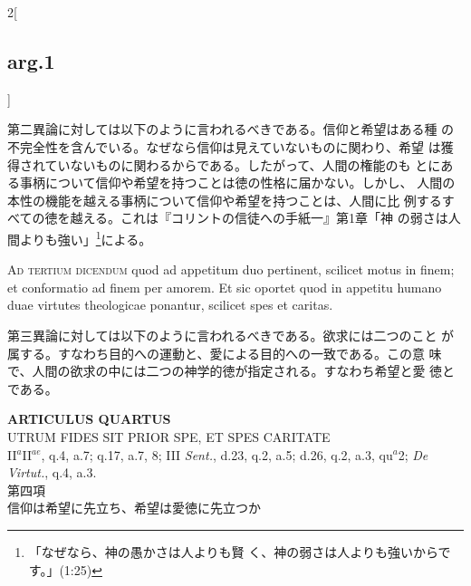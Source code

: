 \documentclass[paper=a4paper,fontsize=10pt,jafontsize=9pt,titlepage]{jlreq}
\begin{document}
\begin{paracol}{2}[\subsection{arg.1}]
\switchcolumn

第二異論に対しては以下のように言われるべきである。信仰と希望はある種
 の不完全性を含んでいる。なぜなら信仰は見えていないものに関わり、希望
 は獲得されていないものに関わるからである。したがって、人間の権能のも
 とにある事柄について信仰や希望を持つことは徳の性格に届かない。しかし、
 人間の本性の機能を越える事柄について信仰や希望を持つことは、人間に比
 例するすべての徳を越える。これは『コリントの信徒への手紙一』第1章「神
 の弱さは人間よりも強い」\footnote{「なぜなら、神の愚かさは人よりも賢
 く、神の弱さは人よりも強いからです。」(1:25)}による。

\switchcolumn*[\subsection{ad.3}]

{\scshape Ad tertium dicendum} quod ad appetitum duo pertinent,
scilicet motus in finem; et conformatio ad finem per amorem. Et sic
oportet quod in appetitu humano duae virtutes theologicae ponantur,
scilicet spes et caritas.

\switchcolumn

第三異論に対しては以下のように言われるべきである。欲求には二つのこと
 が属する。すなわち目的への運動と、愛による目的への一致である。この意
 味で、人間の欲求の中には二つの神学的徳が指定される。すなわち希望と愛
 徳とである。

\end{paracol}
\newpage

{}
\setcounter{section}{4}
\setcounter{subsection}{0}
\begin{center}
{\Large {\bfseries ARTICULUS QUARTUS}}\\
{\large UTRUM FIDES SIT PRIOR SPE, ET SPES CARITATE}\\
{\footnotesize II$^{a}$II$^{ae}$, q.4, a.7; q.17, a.7, 8; III {\itshape Sent.}, d.23, q.2, a.5; d.26, q.2, a.3, qu$^{a}$2; {\itshape De Virtut.}, q.4, a.3.}\\
{\Large 第四項\\信仰は希望に先立ち、希望は愛徳に先立つか}
\end{center}
\end{document}

